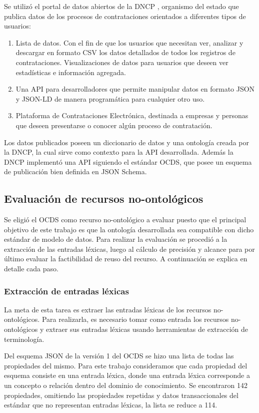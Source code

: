 Se utilizó el portal de datos abiertos de la DNCP \cite{DatosAbiDNCP:online}, organismo del estado que publica datos de los procesos de contrataciones orientados a diferentes tipos de usuarios:


\begin{enumerate}
    \item Lista de datos. Con el fin de que los usuarios que necesitan ver, analizar y descargar en formato CSV los datos detallados de todos los registros de contrataciones.
    Visualizaciones de datos para usuarios que deseen ver estadísticas e información agregada.
    \item Una API para desarrolladores que permite manipular datos en formato JSON y JSON-LD de manera programática para cualquier otro uso.
    \item Plataforma de Contrataciones Electrónica, destinada a empresas y personas que deseen presentarse o conocer algún proceso de contratación.
\end{enumerate}

Los datos publicados poseen un diccionario de datos y una ontología creada por la DNCP, la cual sirve como contexto para la API desarrollada. Además la DNCP implementó una API siguiendo el estándar OCDS, que posee un esquema de publicación bien definida en JSON Schema.

\subsection{Evaluación de recursos no-ontológicos}
Se eligió el OCDS como recurso no-ontológico a evaluar puesto que el principal objetivo de este trabajo es que la ontología desarrollada sea compatible con dicho estándar de modelo de datos. Para realizar la evaluación se procedió a la extracción de las entradas léxicas, luego al cálculo de precisión y alcance para por último evaluar la factibilidad de reuso del recurso.  A continuación se explica en detalle cada paso.

\subsubsection{Extracción de entradas léxicas}
La meta de esta tarea es extraer las entradas léxicas de los recursos no-ontológicos. Para realizarla, es necesario tomar como entrada los recursos no-ontológicos y extraer sus entradas léxicas usando herramientas de extracción de terminología.	
			
Del esquema JSON de la versión 1 del OCDS se hizo una lista de todas las propiedades del mismo. Para este trabajo consideramos que cada propiedad del esquema consiste en una entrada léxica, donde una entrada léxica corresponde a un concepto o relación dentro del dominio de conocimiento. Se encontraron 142 propiedades, omitiendo las propiedades repetidas y datos transaccionales del estándar que no representan entradas léxicas, la lista se reduce a 114.

